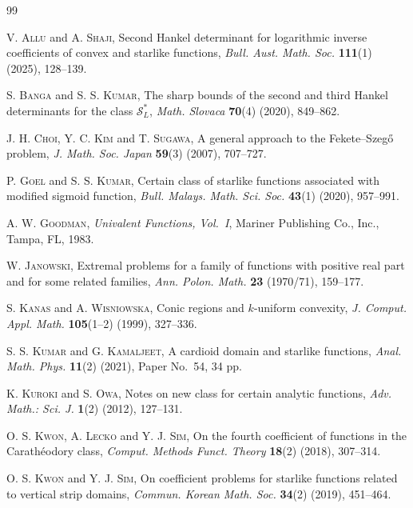 \documentclass[a4paper,12pt,reqno]{amsart} %
\numberwithin{equation}{section}
\theoremstyle{definition}
\begin{document}
\begin{thebibliography}{99}

\textsc{V. Allu} and \textsc{A. Shaji},
Second Hankel determinant for logarithmic inverse coefficients of convex and starlike functions,
\textit{Bull. Aust. Math. Soc.} \textbf{111}(1) (2025), 128--139.

\textsc{S. Banga} and \textsc{S. S. Kumar},
The sharp bounds of the second and third Hankel determinants for the class \( \mathcal{S}_{L}^{*} \),
\textit{Math. Slovaca} \textbf{70}(4) (2020), 849--862.

\textsc{J. H. Choi}, \textsc{Y. C. Kim} and \textsc{T. Sugawa},
A general approach to the Fekete--Szeg\H{o} problem,
\textit{J. Math. Soc. Japan} \textbf{59}(3) (2007), 707--727.

\textsc{P. Goel} and \textsc{S. S. Kumar},
Certain class of starlike functions associated with modified sigmoid function,
\textit{Bull. Malays. Math. Sci. Soc.} \textbf{43}(1) (2020), 957--991.

\textsc{A. W. Goodman},
\textit{Univalent Functions, Vol.~I},
Mariner Publishing Co., Inc., Tampa, FL, 1983.

\textsc{W. Janowski},
Extremal problems for a family of functions with positive real part and for some related families,
\textit{Ann. Polon. Math.} \textbf{23} (1970/71), 159--177.

\textsc{S. Kanas} and \textsc{A. Wisniowska},
Conic regions and \( k \)-uniform convexity,
\textit{J. Comput. Appl. Math.} \textbf{105}(1--2) (1999), 327--336.


\textsc{S. S. Kumar} and \textsc{G. Kamaljeet},
A cardioid domain and starlike functions,
\textit{Anal. Math. Phys.} \textbf{11}(2) (2021), Paper No.~54, 34 pp.

\textsc{K. Kuroki} and \textsc{S. Owa},
Notes on new class for certain analytic functions,
\textit{Adv. Math.: Sci. J.} \textbf{1}(2) (2012), 127--131.

\textsc{O. S. Kwon}, \textsc{A. Lecko} and \textsc{Y. J. Sim},
On the fourth coefficient of functions in the Carath\'eodory class,
\textit{Comput. Methods Funct. Theory} \textbf{18}(2) (2018), 307--314.

\textsc{O. S. Kwon} and \textsc{Y. J. Sim},
On coefficient problems for starlike functions related to vertical strip domains,
\textit{Commun. Korean Math. Soc.} \textbf{34}(2) (2019), 451--464.


\end{thebibliography}
\end{document}
